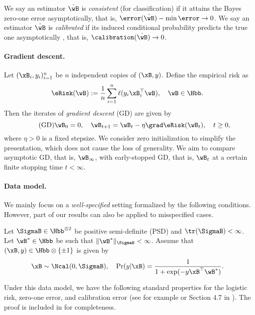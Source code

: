 \documentclass[11pt]{article}
\begin{document}
We say an estimator $\hat \wB$ is \emph{consistent} (for classification) if it attains the Bayes zero-one error asymptotically, that is, $\error(\hat \wB) - \min \error \to 0$.
We say an estimator $\hat\wB$ is \emph{calibrated} if its induced conditional probability predicts the true one asymptotically \citep{foster1998asymptotic}, that is, $\calibration(\hat\wB) \to 0$.




\paragraph{Gradient descent.}
Let $(\xB_i, y_i)_{i=1}^n$ be $n$ independent copies of $(\xB,y)$. Define the empirical risk as 
\begin{equation*}
    \eRisk(\wB):= \frac{1}{n}\sum_{i=1}^n\ell(y_i\xB_i^\top \wB),\quad \wB\in\Hbb.
\end{equation*}
Then the iterates of \emph{gradient descent} (GD) are given by
\begin{equation}\label{eq:GD}\tag{GD}
 \wB_0 =0,\quad 
   \wB_{t+1} = \wB_t - \eta \grad \eRisk(\wB_t),\quad t\ge 0, 
\end{equation}
where $\eta>0$ is a fixed stepsize. We consider zero initialization to simplify the presentation, which does not cause the loss of generality.
We aim to compare asymptotic GD, that is, $\wB_{\infty}$, with early-stopped GD, that is, $\wB_t$ at a certain finite stopping time $t<\infty$.

\paragraph{Data model.}
We mainly focus on a \emph{well-specified} setting formalized by the following conditions. 
However, part of our results can also be applied to misspecified cases. 
\begin{assumption}\label{assump:data-distribution}
Let $\SigmaB \in \Hbb^{\otimes 2}$ be positive semi-definite (PSD) and $\tr(\SigmaB) < \infty$. Let $\wB^*\in\Hbb$ be such that $\|\wB^*\|_{\SigmaB} < \infty$.
Assume that $(\xB, y)\in \Hbb \otimes \{\pm 1\}$ is given by
\begin{align*}
\xB\sim \Ncal(0,\SigmaB),\quad \Pr(y | \xB) = \frac{1}{1+\exp(-y\xB^\top \wB^*)}.
\end{align*}
\end{assumption}

Under this data model, we have the following standard properties for the logistic risk, zero-one error, and calibration error (see for example \citep{ji2021early} or Section 4.7 in \citep{mohri2018foundations}). The proof is included in  for completeness.
\end{document}
